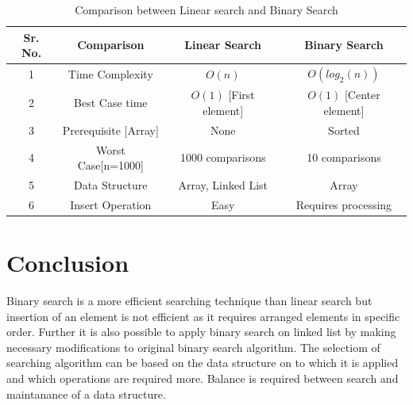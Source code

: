 \documentclass{article}
\begin{document}
\begin{table}[h!]
\begin{center}
\begin{tabular}{|c|c|c|c|}
\hline
\textbf{Sr. No.} & \textbf{Comparison} & \textbf{Linear Search} & \textbf{Binary Search}\\
\hline
1 & Time Complexity & $O(n)$ & $O(log_2(n))$ \\
2 & Best Case time & $O(1)$ [First element] & $O(1)$ [Center element] \\
3 & Prerequisite [Array] & None & Sorted \\
4 & Worst Case[n=1000] & 1000 comparisons & 10 comparisons \\
5 & Data Structure & Array, Linked List & Array \\
6 & Insert Operation & Easy & Requires processing \\
\hline
\end{tabular}
\caption{Comparison between Linear search and Binary Search\cite{uni}}
\label{table:summary}
\end{center}
\end{table}

\section{Conclusion}
Binary search is a more efficient searching technique than linear search but insertion of an element is not efficient as it requires arranged elements in specific order. Further it is also possible to apply binary search on linked list by making necessary modifications to original binary search algorithm. The selectiom of searching algorithm can be based on the data structure on to which it is applied and which operations are required more. Balance is required between search and maintanance of a data structure.\cite{uni}




\newpage
{}
\printindex
\end{document}
